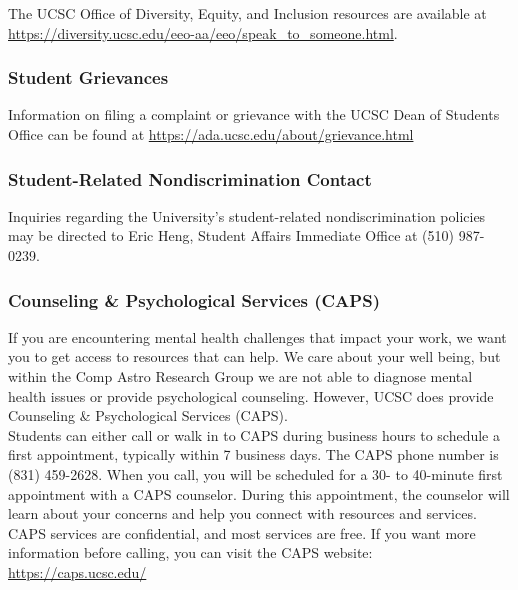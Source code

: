 The UCSC Office of Diversity, Equity, and Inclusion resources are available at
\href{https://diversity.ucsc.edu/eeo-aa/eeo/speak_to_someone.html}{https://diversity.ucsc.edu/eeo-aa/eeo/speak\_to\_someone.html}.

\subsubsection{Student Grievances}
\label{sec:student_grievances}

\noindent
Information on filing a complaint or grievance with the UCSC Dean of Students Office
can be found at
\href{https://ada.ucsc.edu/about/grievance.html}{https://ada.ucsc.edu/about/grievance.html}

\subsubsection{Student-Related Nondiscrimination Contact}
Inquiries regarding the University's student-related nondiscrimination policies may be directed to Eric Heng, Student Affairs Immediate Office at (510) 987-0239.

\subsubsection{Counseling \& Psychological Services (CAPS)}

If you are encountering mental health challenges that impact your work, we want you to get access to resources that can help. We care about your well being, but within the Comp Astro Research Group we are not able to diagnose mental health issues or provide psychological counseling. However, UCSC does provide Counseling \& Psychological Services (CAPS).\\

\noindent
Students can either call or walk in to CAPS during business hours to schedule a first appointment, typically within 7 business days. The CAPS phone number is (831) 459-2628. When you call, you will be scheduled for a 30- to 40-minute first appointment with a CAPS counselor. During this appointment, the counselor will learn about your concerns and help you connect with resources and services. CAPS services are confidential, and most services are free. If you want more information before calling, you can visit the CAPS website: \\

\noindent
\href{https://caps.ucsc.edu/}{https://caps.ucsc.edu/}\\

